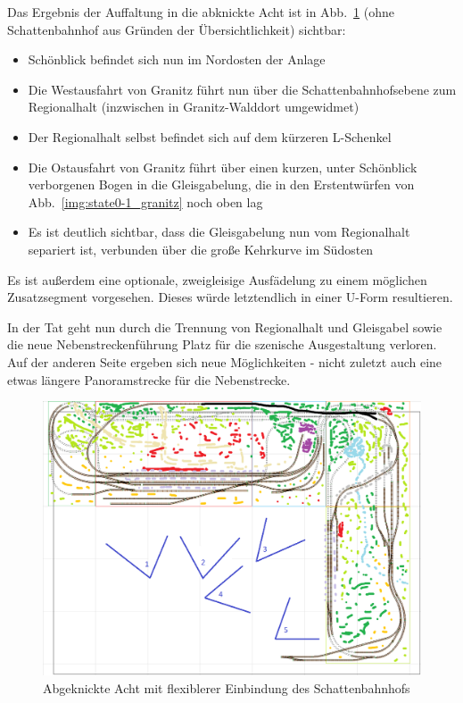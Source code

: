 Das Ergebnis der Auffaltung in die abknickte Acht ist in Abb.~\ref{img:state2_granitz_modules_details} (ohne Schattenbahnhof aus Gr\"unden der \"Ubersichtlichkeit) sichtbar:
\begin{itemize}
	\item Sch\"onblick befindet sich nun im Nordosten der Anlage
	\item Die Westausfahrt von Granitz f\"uhrt nun \"uber die Schattenbahnhofsebene zum Regionalhalt (inzwischen in Granitz-Walddort umgewidmet)
	\item Der Regionalhalt selbst befindet sich auf dem k\"urzeren L-Schenkel
	\item Die Ostausfahrt von Granitz f\"uhrt \"uber einen kurzen, unter Sch\"onblick verborgenen Bogen in die Gleisgabelung, die in den Erstentw\"urfen von Abb.~\ref{img:state0-1_granitz} noch oben lag
	\item Es ist deutlich sichtbar, dass die Gleisgabelung nun vom Regionalhalt separiert ist, verbunden \"uber die gro{\ss}e Kehrkurve im S\"udosten
\end{itemize}

Es ist au{\ss}erdem eine optionale, zweigleisige Ausf\"adelung zu einem m\"oglichen Zusatzsegment vorgesehen.
Dieses w\"urde letztendlich in einer U-Form resultieren.

In der Tat geht nun durch die Trennung von Regionalhalt und Gleisgabel sowie die neue Nebenstreckenf\"uhrung Platz f\"ur die szenische Ausgestaltung verloren.
Auf der anderen Seite ergeben sich neue M\"oglichkeiten - nicht zuletzt auch eine etwas l\"angere Panoramstrecke f\"ur die Nebenstrecke.

\begin{figure}[h]
\centering
  \includegraphics[width=1.0\textwidth]{img/map_evolution/state2_granitz_modules_details.png}
	\caption{Abgeknickte Acht mit flexiblerer Einbindung des Schattenbahnhofs}
	\label{img:state2_granitz_modules_details}
\end{figure}


